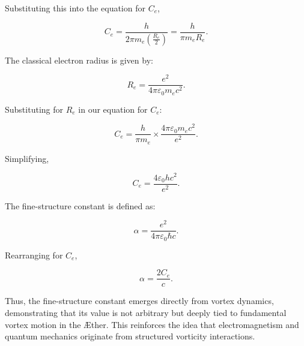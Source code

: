 Substituting this into the equation for $C_e$,

\begin{equation}
    C_e = \frac{h}{2 \pi m_e \left(\frac{R_e}{2}\right)} = \frac{h}{\pi m_e R_e}.
\end{equation}

The classical electron radius is given by:

\begin{equation}
    R_e = \frac{e^2}{4 \pi \varepsilon_0 m_e c^2}.
\end{equation}

Substituting for $R_e$ in our equation for $C_e$:

\begin{equation}
    C_e = \frac{h}{\pi m_e} \times \frac{4 \pi \varepsilon_0 m_e c^2}{e^2}.
\end{equation}

Simplifying,

\begin{equation}
    C_e = \frac{4 \varepsilon_0 h c^2}{e^2}.
\end{equation}

The fine-structure constant is defined as:

\begin{equation}
    \alpha = \frac{e^2}{4 \pi \varepsilon_0 \hbar c}.
\end{equation}

Rearranging for $C_e$,

\begin{equation}
    \alpha = \frac{2 C_e}{c}.
\end{equation}

Thus, the fine-structure constant emerges directly from vortex dynamics, demonstrating that its value is not arbitrary but deeply tied to fundamental vortex motion in the Æther. This reinforces the idea that electromagnetism and quantum mechanics originate from structured vorticity interactions.